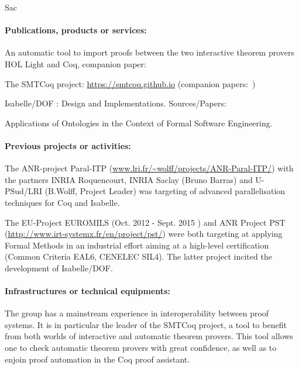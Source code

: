 \begin{sitedescription}{Sac}
\paragraph*{Publications, products or services:}

\begin{compactitem}
\item An automatic tool to import proofs between the two interactive
  theorem provers HOL Light and Coq, companion
  paper:~\cite{DBLP:conf/itp/KellerW10}
\item The SMTCoq project: \url{https://smtcoq.github.io} (companion
  papers:~\cite{DBLP:conf/cpp/ArmandFGKTW11,DBLP:conf/cav/EkiciMTKKRB17})
\item Isabelle/DOF : Design and Implementations.
 Sources/Papers: \cite{brucker_achim_d_2019_3370483,brucker.ea:isabelle-ontologies:2018}
\item Applications of Ontologies in the Context of Formal Software Engineering.
 \cite{brucker.ea:ontologies-certification:2019}
\end{compactitem}

\paragraph*{Previous projects or activities:}

\begin{compactitem}
\item The ANR-project Paral-ITP (\url{www.lri.fr/~wolff/projects/ANR-Paral-ITP/}) with the  
      partners INRIA Roquencourt, INRIA Saclay (Bruno Barras) 
      and U-PSud/LRI (B.Wolff, Project Leader) was targeting 
      of advanced parallelisation techniques for Coq and Isabelle.
\item The EU-Project EUROMILS (Oct. 2012 - Sept. 2015 ) and 
      ANR Project PST (\url{http://www.irt-systemx.fr/en/project/pst/})
      were both targeting at applying Formal Methods in an industrial
      effort aiming at a high-level certification (Common Criteria EAL6, 
      CENELEC SIL4). The latter project incited the development of 
      Isabelle/DOF\cite{brucker_achim_d_2019_3370483}.
\end{compactitem} 

\paragraph*{Infrastructures or technical equipments:}

The group has a mainstream experience in interoperability between proof
systems. It is in particular the leader of the SMTCoq project, a tool to
benefit from both worlds of interactive and automatic theorem provers.
This tool allows one to check automatic theorem provers with great
confidence, as well as to enjoin proof automation in the Coq proof
assistant.


\end{sitedescription}
